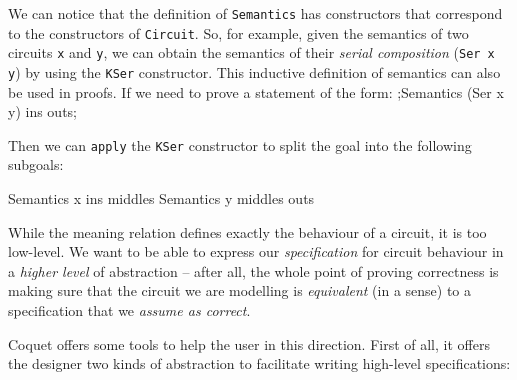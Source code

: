 \documentclass[a4paper]{article}
\begin{document}
                We can notice that the definition of \texttt{Semantics} has constructors that
                correspond to the constructors of \texttt{Circuit}. So, for example, given the
                semantics of two circuits \texttt{x} and \texttt{y}, we can obtain the semantics of
                their \emph{serial composition} (\texttt{Ser x y}) by using the \texttt{KSer}
                constructor. This inductive definition of semantics can also be used in proofs. If
                we need to prove a statement of the form:
                \coq;Semantics (Ser x y) ins outs;

                Then we can \texttt{apply} the \texttt{KSer} constructor to split the goal into the
                following subgoals:

                \begin{coqcode}
        Semantics x ins middles
        Semantics y middles outs
                \end{coqcode}

                While the meaning relation defines exactly the behaviour of a circuit, it is too
                low-level. We want to be able to express our \emph{specification} for circuit
                behaviour in a \emph{higher level} of abstraction -- after all, the whole point of
                proving correctness is making sure that the circuit we are modelling is
                \emph{equivalent} (in a sense) to a specification that we \emph{assume as correct}.

                Coquet offers some tools to help the user in this direction. First of all, it offers
                the designer two kinds of abstraction to facilitate writing high-level
                specifications:
\end{document}
